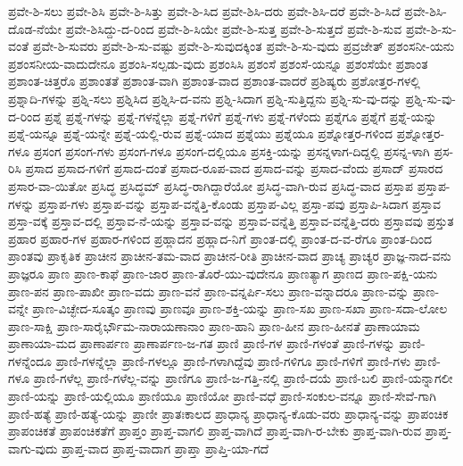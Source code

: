 {ಪ್ರವೇ-ಶಿ-ಸಲು
ಪ್ರವೇ-ಶಿಸಿ
ಪ್ರವೇ-ಶಿ-ಸಿತ್ತು
ಪ್ರವೇ-ಶಿ-ಸಿದ
ಪ್ರವೇ-ಶಿಸಿ-ದರು
ಪ್ರವೇ-ಶಿಸಿ-ದರೆ
ಪ್ರವೇ-ಶಿ-ಸಿದೆ
ಪ್ರವೇ-ಶಿಸಿ-ದೊಡ-ನೆಯೇ
ಪ್ರವೇ-ಶಿಸಿದ್ದು-ದ-ರಿಂದ
ಪ್ರವೇ-ಶಿ-ಸಿಯೇ
ಪ್ರವೇ-ಶಿ-ಸುತ್ತ
ಪ್ರವೇ-ಶಿ-ಸುತ್ತದೆ
ಪ್ರವೇ-ಶಿ-ಸುವ
ಪ್ರವೇ-ಶಿ-ಸು-ವಂತೆ
ಪ್ರವೇ-ಶಿ-ಸುವರು
ಪ್ರವೇ-ಶಿ-ಸು-ವಷ್ಟು
ಪ್ರವೇ-ಶಿ-ಸುವುದಕ್ಕಿಂತ
ಪ್ರವೇ-ಶಿ-ಸು-ವುದು
ಪ್ರವ್ರಜೇತ್
ಪ್ರಶಂಸನೀ-ಯನು
ಪ್ರಶಂಸನೀಯ-ವಾದುದೇನೂ
ಪ್ರಶಂಸಿ-ಸಲ್ಪಡು-ವುದು
ಪ್ರಶಂಸಿಸಿ
ಪ್ರಶಂಸೆ
ಪ್ರಶಂಸೆ-ಯನ್ನೂ
ಪ್ರಶಂಸೆಯೇ
ಪ್ರಶಾಂತ
ಪ್ರಶಾಂತ-ಚಿತ್ತರೊ
ಪ್ರಶಾಂತತೆ
ಪ್ರಶಾಂತ-ವಾಗಿ
ಪ್ರಶಾಂತ-ವಾದ
ಪ್ರಶಾಂತ-ವಾದರೆ
ಪ್ರಶಿಷ್ಯರು
ಪ್ರಶೋತ್ತರ-ಗಳಲ್ಲಿ
ಪ್ರಶ್ನಾದಿ-ಗಳನ್ನು
ಪ್ರಶ್ನಿ-ಸಲು
ಪ್ರಶ್ನಿಸಿದ
ಪ್ರಶ್ನಿಸಿ-ದ-ವನು
ಪ್ರಶ್ನಿ-ಸಿದಾಗ
ಪ್ರಶ್ನಿ-ಸುತ್ತಿದ್ದನು
ಪ್ರಶ್ನಿ-ಸು-ವು-ದನ್ನು
ಪ್ರಶ್ನಿ-ಸು-ವು-ದ-ರಿಂದ
ಪ್ರಶ್ನೆ
ಪ್ರಶ್ನೆ-ಗಳನ್ನು
ಪ್ರಶ್ನೆ-ಗಳನ್ನೆಲ್ಲಾ
ಪ್ರಶ್ನೆ-ಗಳಿಗೆ
ಪ್ರಶ್ನೆ-ಗಳು
ಪ್ರಶ್ನೆ-ಗಳೆಂದು
ಪ್ರಶ್ನೆಗೂ
ಪ್ರಶ್ನೆಗೆ
ಪ್ರಶ್ನೆ-ಯನ್ನು
ಪ್ರಶ್ನೆ-ಯನ್ನೂ
ಪ್ರಶ್ನೆ-ಯನ್ನೇ
ಪ್ರಶ್ನೆ-ಯಲ್ಲಿ-ರುವ
ಪ್ರಶ್ನೆ-ಯಾದ
ಪ್ರಶ್ನೆಯು
ಪ್ರಶ್ನೆಯೂ
ಪ್ರಶ್ನೋತ್ತರ-ಗಳಿಂದ
ಪ್ರಶ್ನೋತ್ತರ-ಗಳೂ
ಪ್ರಸಂಗ
ಪ್ರಸಂಗ-ಗಳು
ಪ್ರಸಂಗ-ಗಳೂ
ಪ್ರಸಂಗ-ದಲ್ಲಿಯೂ
ಪ್ರಸಕ್ತಿ-ಯನ್ನು
ಪ್ರಸನ್ನಳಾಗ-ದಿದ್ದಲ್ಲಿ
ಪ್ರಸನ್ನ-ಳಾಗಿ
ಪ್ರಸ-ರಿಸಿ
ಪ್ರಸಾದ
ಪ್ರಸಾದ-ಗಳಿಗೆ
ಪ್ರಸಾದ-ದಂತೆ
ಪ್ರಸಾದ-ರೂಪ-ವಾದ
ಪ್ರಸಾದ-ವನ್ನು
ಪ್ರಸಾದ-ವೆಂದು
ಪ್ರಸಾದ್
ಪ್ರಸಾರದ
ಪ್ರಸಾರ-ವಾ-ಯಿತೋ
ಪ್ರಸಿದ್ಧ
ಪ್ರಸಿದ್ಧಮ್
ಪ್ರಸಿದ್ಧ-ರಾಗಿದ್ದಾರೆಯೋ
ಪ್ರಸಿದ್ಧ-ವಾಗಿ-ರುವ
ಪ್ರಸಿದ್ಧ-ವಾದ
ಪ್ರಸ್ತಾಪ
ಪ್ರಸ್ತಾಪ-ಗಳನ್ನು
ಪ್ರಸ್ತಾಪ-ಗಳು
ಪ್ರಸ್ತಾಪ-ವನ್ನು
ಪ್ರಸ್ತಾಪ-ವನ್ನೆತ್ತಿ-ಕೊಂಡು
ಪ್ರಸ್ತಾಪ-ವಿಲ್ಲ
ಪ್ರಸ್ತಾ-ಪವು
ಪ್ರಸ್ತಾಪಿ-ಸಿದಾಗ
ಪ್ರಸ್ತಾವ
ಪ್ರಸ್ತಾ-ವಕ್ಕೆ
ಪ್ರಸ್ತಾವ-ದಲ್ಲಿ
ಪ್ರಸ್ತಾವ-ನೆ-ಯನ್ನು
ಪ್ರಸ್ತಾವ-ವನ್ನು
ಪ್ರಸ್ತಾವ-ವನ್ನೆತ್ತಿ
ಪ್ರಸ್ತಾವ-ವನ್ನೆತ್ತಿ-ದರು
ಪ್ರಸ್ತಾವವು
ಪ್ರಸ್ತುತ
ಪ್ರಹಾರ
ಪ್ರಹಾರ-ಗಳ
ಪ್ರಹಾರ-ಗಳಿಂದ
ಪ್ರಹ್ಲಾದನ
ಪ್ರಹ್ಲಾದ-ನಿಗೆ
ಪ್ರಾಂತ-ದಲ್ಲಿ
ಪ್ರಾಂತ-ದ-ವ-ರೆಗೂ
ಪ್ರಾಂತ-ದಿಂದ
ಪ್ರಾಂತವು
ಪ್ರಾಕೃತಿಕ
ಪ್ರಾಚೀನ
ಪ್ರಾಚೀನ-ತಮ-ವಾದ
ಪ್ರಾಚೀನ-ರೀತಿ
ಪ್ರಾಚೀನ-ವಾದ
ಪ್ರಾಚ್ಯ
ಪ್ರಾಚ್ಯರ
ಪ್ರಾಜ್ಞ-ನಾದ-ವನು
ಪ್ರಾಜ್ಞರೂ
ಪ್ರಾಣ
ಪ್ರಾಣ-ಕಾಫೆ
ಪ್ರಾಣ-ಜಾರ
ಪ್ರಾಣ-ತೊರೆ-ಯು-ವುದೇನೂ
ಪ್ರಾಣತ್ಯಾಗ
ಪ್ರಾಣದ
ಪ್ರಾಣ-ಪಕ್ಷಿ-ಯನು
ಪ್ರಾಣ-ಪನ
ಪ್ರಾಣ-ಪಾಖೀ
ಪ್ರಾಣ-ವದು
ಪ್ರಾಣ-ವನೆ
ಪ್ರಾಣ-ವನ್ನರ್ಪಿ-ಸಲು
ಪ್ರಾಣ-ವನ್ನಾದರೂ
ಪ್ರಾಣ-ವನ್ನು
ಪ್ರಾಣ-ವನ್ನೇ
ಪ್ರಾಣ-ವಿಚ್ಛೇದ-ಸೂತ್ಕಂ
ಪ್ರಾಣವು
ಪ್ರಾಣವೂ
ಪ್ರಾಣ-ಶಕ್ತಿ-ಯನ್ನು
ಪ್ರಾಣ-ಸಖ
ಪ್ರಾಣ-ಸಖಾ
ಪ್ರಾಣ-ಸದಾ-ಲೋಲ
ಪ್ರಾಣ-ಸಾಕ್ಷಿ
ಪ್ರಾಣ-ಸಾರೈರ್ಭೌಮ-ನಾರಾಯಣಾನಾಂ
ಪ್ರಾಣ-ಹಾನಿ
ಪ್ರಾಣ-ಹೀನ
ಪ್ರಾಣ-ಹೀನತೆ
ಪ್ರಾಣಾಯಾಮ
ಪ್ರಾಣಾಯಾ-ಮದ
ಪ್ರಾಣಾರ್ಪಣ
ಪ್ರಾಣಾರ್ಪಣ-ಜ-ಗತ
ಪ್ರಾಣಿ
ಪ್ರಾಣಿ-ಗಳ
ಪ್ರಾಣಿ-ಗಳಂತೆ
ಪ್ರಾಣಿ-ಗಳನ್ನು
ಪ್ರಾಣಿ-ಗಳನ್ನೆಂದೂ
ಪ್ರಾಣಿ-ಗಳನ್ನೆಲ್ಲಾ
ಪ್ರಾಣಿ-ಗಳಲ್ಲೂ
ಪ್ರಾಣಿ-ಗಳಾಗಿದ್ದೆವು
ಪ್ರಾಣಿ-ಗಳಿಗೂ
ಪ್ರಾಣಿ-ಗಳಿಗೆ
ಪ್ರಾಣಿ-ಗಳು
ಪ್ರಾಣಿ-ಗಳೂ
ಪ್ರಾಣಿ-ಗಳೆಲ್ಲ
ಪ್ರಾಣಿ-ಗಳೆಲ್ಲ-ವನ್ನು
ಪ್ರಾಣಿಗೂ
ಪ್ರಾಣಿ-ಜ-ಗತ್ತಿ-ನಲ್ಲಿ
ಪ್ರಾಣಿ-ದಯೆ
ಪ್ರಾಣಿ-ಬಲಿ
ಪ್ರಾಣಿ-ಯನ್ನಾಗಲೀ
ಪ್ರಾಣಿ-ಯನ್ನು
ಪ್ರಾಣಿ-ಯಲ್ಲಿಯೂ
ಪ್ರಾಣಿಯೂ
ಪ್ರಾಣಿಯೋ
ಪ್ರಾಣಿ-ವಧೆ
ಪ್ರಾಣಿ-ಸಂಕುಲ-ವನ್ನೂ
ಪ್ರಾಣಿ-ಸೇವೆ-ಗಾಗಿ
ಪ್ರಾಣಿ-ಹತ್ಯೆ
ಪ್ರಾಣಿ-ಹತ್ಯೆ-ಯನ್ನು
ಪ್ರಾಣೀ
ಪ್ರಾತಃಕಾಲದ
ಪ್ರಾಧಾನ್ಯ
ಪ್ರಾಧಾನ್ಯ-ಕೊಡು-ವರು
ಪ್ರಾಧಾನ್ಯ-ವನ್ನು
ಪ್ರಾಪಂಚಿಕ
ಪ್ರಾಪಂಚಿಕತೆ
ಪ್ರಾಪಂಚಿಕತೆಗೆ
ಪ್ರಾಪ್ತಂ
ಪ್ರಾಪ್ತ-ವಾಗಲಿ
ಪ್ರಾಪ್ತ-ವಾಗಿದೆ
ಪ್ರಾಪ್ತ-ವಾಗಿ-ರ-ಬೇಕು
ಪ್ರಾಪ್ತ-ವಾಗಿ-ರುವ
ಪ್ರಾಪ್ತ-ವಾಗು-ವುದು
ಪ್ರಾಪ್ತ-ವಾದ
ಪ್ರಾಪ್ತ-ವಾದಾಗ
ಪ್ರಾಪ್ತಾ
ಪ್ರಾಪ್ತಿ-ಯಾ-ಗದೆ
}
